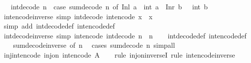 \begin{isabellebody}
\ \ \ {\isachardoublequoteopen}int{\isacharunderscore}decode\ n\ {\isacharequal}\ {\isacharparenleft}case\ sum{\isacharunderscore}decode\ n\ of\ Inl\ a\ {\isasymRightarrow}\ int\ a\ {\isacharbar}\ Inr\ b\ {\isasymRightarrow}\ {\isacharminus}\ int\ b\ {\isacharminus}\ {}{\isacharparenright}{\isachardoublequoteclose}\isanewline
\isanewline
{}\isamarkupfalse%
\ int{\isacharunderscore}encode{\isacharunderscore}inverse\ {\isacharbrackleft}simp{\isacharbrackright}{\isacharcolon}\ {\isachardoublequoteopen}int{\isacharunderscore}decode\ {\isacharparenleft}int{\isacharunderscore}encode\ x{\isacharparenright}\ {\isacharequal}\ x{\isachardoublequoteclose}\isanewline
%
\isadelimproof
\ \ %
\endisadelimproof
%
\isatagproof
{}\isamarkupfalse%
\ {\isacharparenleft}simp\ add{\isacharcolon}\ int{\isacharunderscore}decode{\isacharunderscore}def\ int{\isacharunderscore}encode{\isacharunderscore}def{\isacharparenright}%
\endisatagproof
{\isafoldproof}%
%
\isadelimproof
\isanewline
%
\endisadelimproof
\isanewline
{}\isamarkupfalse%
\ int{\isacharunderscore}decode{\isacharunderscore}inverse\ {\isacharbrackleft}simp{\isacharbrackright}{\isacharcolon}\ {\isachardoublequoteopen}int{\isacharunderscore}encode\ {\isacharparenleft}int{\isacharunderscore}decode\ n{\isacharparenright}\ {\isacharequal}\ n{\isachardoublequoteclose}\isanewline
%
\isadelimproof
\ \ %
\endisadelimproof
%
\isatagproof
{}\isamarkupfalse%
\ int{\isacharunderscore}decode{\isacharunderscore}def\ int{\isacharunderscore}encode{\isacharunderscore}def\isanewline
\ \ \isamarkupfalse%
\ sum{\isacharunderscore}decode{\isacharunderscore}inverse\ {\isacharbrackleft}of\ n{\isacharbrackright}\ \isamarkupfalse%
\ {\isacharparenleft}cases\ {\isachardoublequoteopen}sum{\isacharunderscore}decode\ n{\isachardoublequoteclose}{\isacharparenright}\ simp{\isacharunderscore}all%
\endisatagproof
{\isafoldproof}%
%
\isadelimproof
\isanewline
%
\endisadelimproof
\isanewline
{}\isamarkupfalse%
\ inj{\isacharunderscore}int{\isacharunderscore}encode{\isacharcolon}\ {\isachardoublequoteopen}inj{\isacharunderscore}on\ int{\isacharunderscore}encode\ A{\isachardoublequoteclose}\isanewline
%
\isadelimproof
\ \ %
\endisadelimproof
%
\isatagproof
{}\isamarkupfalse%
\ {\isacharparenleft}rule\ inj{\isacharunderscore}on{\isacharunderscore}inverseI{\isacharparenright}\ {\isacharparenleft}rule\ int{\isacharunderscore}encode{\isacharunderscore}inverse{\isacharparenright}%
\endisatagproof
{\isafoldproof}%

\end{isabellebody}
